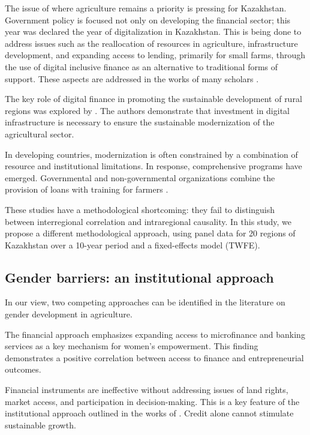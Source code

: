 \documentclass[pdflatex,sn-mathphys-ay]{sn-jnl}
\begin{document}
The issue of where agriculture remains a priority is pressing for
Kazakhstan. Government policy is focused not only on developing the
financial sector; this year was declared the year of digitalization in
Kazakhstan. This is being done to address issues such as the
reallocation of resources in agriculture, infrastructure development,
and expanding access to lending, primarily for small farms, through the
use of digital inclusive finance as an alternative to traditional forms
of support. These aspects are addressed in the works of many scholars
\citep{ref56,ref80}.

The key role of digital finance in promoting the sustainable development
of rural regions was explored by \citet{ref87}.
The authors demonstrate that investment in digital infrastructure is
necessary to ensure the sustainable modernization of the agricultural
sector.

In developing countries, modernization is often constrained by a
combination of resource and institutional limitations. In response,
comprehensive programs have emerged. Governmental and non-governmental
organizations combine the provision of loans with training for farmers
\citep{ref74,ref13,ref73}.

These studies have a methodological shortcoming: they fail to
distinguish between interregional correlation and intraregional
causality. In this study, we propose a different methodological
approach, using panel data for 20 regions of Kazakhstan over a 10-year
period and a fixed-effects model (TWFE).

\subsection{Gender barriers: an institutional approach}

In our view, two competing approaches can be identified in the
literature on gender development in agriculture.

The financial approach \citep{ref60,ref88} emphasizes expanding access to microfinance and banking
services as a key mechanism for women's empowerment. This finding demonstrates a
positive correlation between access to finance and entrepreneurial
outcomes.

Financial instruments are ineffective without addressing issues of land
rights, market access, and participation in decision-making. This is a
key feature of the institutional approach outlined in the works of
\citep{ref78,ref26,ref02,ref32,ref36,ref66}. Credit alone
cannot stimulate sustainable growth.
\end{document}
